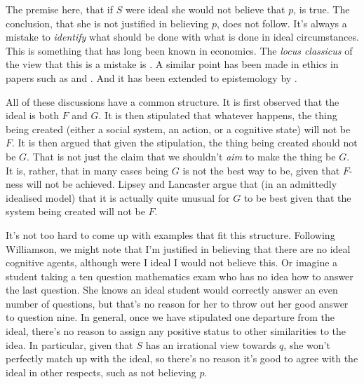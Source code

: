 {The premise here, that if \(S\) were ideal she would not believe that \(p\), is true. The conclusion, that she is not justified in believing \(p\), does not follow. It's always a mistake to \textit{identify} what should be done with what is done in ideal circumstances. This is something that has long been known in economics. The \textit{locus classicus} of the view that this is a mistake is \cite{LipseyLancaster}. A similar point has been made in ethics in papers such as \cite{Watson1977} and \cite{KennettSmith1996b, KennettSmith1996a}. And it has been extended to epistemology by \cite{Williamson1998-WILCOK}.

All of these discussions have a common structure. It is first observed that the ideal is both \(F\) and \(G\). It is then stipulated that whatever happens, the thing being created (either a social system, an action, or a cognitive state) will not be \(F\). It is then argued that given the stipulation, the thing being created should not be \(G\). That is not just the claim that we shouldn't \textit{aim} to make the thing be \(G\). It is, rather, that in many cases being \(G\) is not the best way to be, given that \(F\)-ness will not be achieved. Lipsey and Lancaster argue that (in an admittedly idealised model) that it is actually quite unusual for \(G\) to be best given that the system being created will not be \(F\).

It's not too hard to come up with examples that fit this structure. Following Williamson, we might note that I'm justified in believing that there are no ideal cognitive agents, although were I ideal I would not believe this. Or imagine a student taking a ten question mathematics exam who has no idea how to answer the last question. She knows an ideal student would correctly answer an even number of questions, but that's no reason for her to throw out her good answer to question nine. In general, once we have stipulated one departure from the ideal, there's no reason to assign any positive status to other similarities to the idea. In particular, given that \(S\) has an irrational view towards \(q\), she won't perfectly match up with the ideal, so there's no reason it's good to agree with the ideal in other respects, such as not believing \(p\).

}
